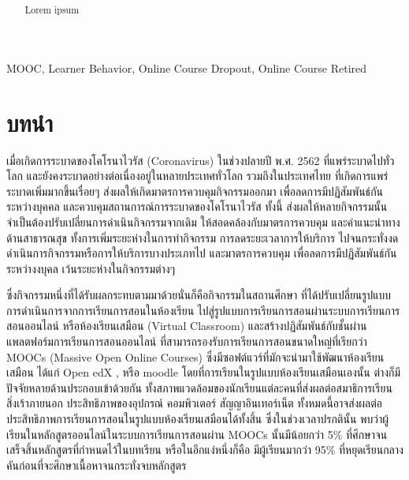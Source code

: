 \documentclass[conference]{IEEEtran}
\title{
    \SNATopic \\
}
\author{
    \IEEEauthorblockN{\Me} \newline
    \IEEEauthorblockA{\MyEmail} \newline
    \IEEEauthorblockA{ภาคการศึกษาที่ 2 ประจำปีการศึกษา 2563} \newline
    \IEEEauthorblockA{ภาควิชาวิทยาการคอมพิวเตอร์ คณะวิทยาศาสตร์} \newline
    \IEEEauthorblockA{มหาวิทยาลัยศรีนครินทรวิโรฒ ประสานมิตร}
}
\begin{document}
    \maketitle

    \begin{abstract}
        Lorem ipsum
    \end{abstract}

    \begin{IEEEkeywords}
        MOOC, Learner Behavior, Online Course Dropout, Online Course Retired
    \end{IEEEkeywords}

    \section{บทนำ}
    เมื่อเกิดการระบาดของโคโรนาไวรัส (Coronavirus) ในช่วงปลายปี พ.ศ. 2562 \cite{covid:coronavirus}
    ที่แพร่ระบาดไปทั่วโลก และยังคงระบาดอย่างต่อเนื่องอยู่ในหลายประเทศทั่วโลก \cite{covid:worldtrendspread}
    รวมถึงในประเทศไทย \cite{covid:thailandspread} ที่เกิดการแพร่ระบาดเพิ่มมากขึ้นเรื่อยๆ
    ส่งผลให้เกิดมาตรการควบคุมกิจกรรมออกมา เพื่อลดการมีปฏิสัมพันธ์กันระหว่างบุคคล 
    และควบคุมสถานการณ์การระบาดของโคโรนาไวรัส \cite{covid:ratchakitcha:22}
    ทั้งนี้ ส่งผลให้หลายกิจกรรมนั้นจำเป็นต้องปรับเปลี่ยนการดำเนินกิจกรรมจากเดิม
    ให้สอดคล้องกับมาตรการควบคุม และคำแนะนำทางด้านสาธารณสุข \cite{covid:socialdistancing} 
    ทั้งการเพิ่มระยะห่างในการทำกิจกรรม การลดระยะเวลาการให้บริการ 
    ไปจนกระทั่งงดดำเนินการกิจกรรมหรือการให้บริการบางประเภทไป 
    และมาตรการควบคุม เพื่อลดการมีปฏิสัมพันธ์กันระหว่างงบุคล เว้นระยะห่างในกิจกรรมต่างๆ 

    ซึ่งกิจกรรมหนึ่งที่ได้รับผลกระทบตามมาด้วยนั่นก็คือกิจกรรมในสถานศึกษา 
    ที่ได้ปรับเปลี่ยนรูปแบบการดำเนินการจากการเรียนการสอนในห้องเรียน 
    ไปสู่รูปแบบการเรียนการสอนผ่านระบบการเรียนการสอนออนไลน์ หรือห้องเรียนเสมือน
    (Virtual Classroom) และสร้างปฏิสัมพันธ์กับชั้นผ่านแพลตฟอร์มการเรียนการสอนออนไลน์
    ที่สามารถรองรับการเรียนการสอนขนาดใหญ่ที่เรียกว่า MOOCs (Massive Open Online Courses)
    ซึ่งมีซอฟต์แวร์ที่มักจะนำมาใช้พัฒนาห้องเรียนเสมือน ได้แก่ Open edX \cite{mooctools:openedx},
    หรือ moodle \cite{mooctools:moodle} โดยที่การเรียนในรูปแบบห้องเรียนเสมือนเองนั้น
    ต่างก็มีปัจจัยหลายด้านประกอบเข้าด้วยกัน 
    ทั้งสภาพแวดล้อมของนักเรียนแต่ละคนที่ส่งผลต่อสมาธิการเรียน สิ่งเร้าภายนอก
    ประสิทธิภาพของอุปกรณ์ คอมพิวเตอร์ สัญญาอินเทอร์เน็ต 
    ทั้งหมดนี้อาจส่งผลต่อประสิทธิภาพการเรียนการสอนในรูปแบบห้องเรียนเสมือนได้ทั้งสิ้น
    ซึ่งในช่วงเวลาปรกตินั้น พบว่าผู้เรียนในหลักสูตรออนไลน์ในระบบการเรียนการสอนผ่าน
    MOOCs นั้นมีน้อยกว่า 5\% ที่ศึกษาจนเสร็จสิ้นหลักสูตรที่กำหนดไว้ในบทเรียน \cite{Feng_Tang_Liu_2019}
    หรือในอีกแง่หนึ่งก็คือ มีผู้เรียนมากว่า 95\% 
    ที่หยุดเรียนกลางคันก่อนที่จะศึกษาเนื้อหาจนกระทั่งจบหลักสูตร
\end{document}
